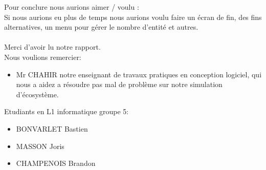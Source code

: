 \documentclass[a4paper, 11pt]{article}
\begin{document}
Pour conclure nous aurions aimer / voulu :\\
Si nous aurions eu plus de temps nous aurions voulu faire un écran de fin, des fins alternatives, un menu pour gérer le nombre d'entité et autres.\\
\vspace{1cm}
\\
\vspace{1cm}
Merci d'avoir lu notre rapport.\\
Nous voulions remercier:\\
\begin{itemize}
\item Mr CHAHIR notre enseignant de travaux pratiques en conception logiciel, qui nous a aidez a résoudre pas mal de problème sur notre simulation d'écosystème.
\end{itemize}

\vspace{1cm}

Etudiants en L1 informatique groupe 5:\\
\begin{itemize}
\item BONVARLET Bastien\\
\item MASSON Joris\\
\item CHAMPENOIS Brandon\\
\end{itemize}

\newpage
\end{document}
